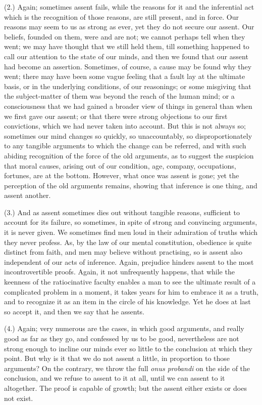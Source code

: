 (2.) Again; sometimes assent fails, while the reasons for it and
the inferential act which is the recognition of those reasons, are
still present, and in force. Our reasons may seem to us as
strong as ever, yet they do not secure our assent. Our beliefs,
founded on them, were and are not; we cannot perhaps tell when they
went; we may have thought that we still held them, till something
happened to call our attention to the state of our minds, and then we
found that our assent had become an assertion. Sometimes, of course, a
cause may be found why they went; there may have been some vague
feeling that a fault lay at the ultimate basis, or in the underlying
conditions, of our reasonings; or some misgiving that the
subject-matter of them was beyond the reach of the human mind; or a
consciousness that we had gained a broader view of things in general
than when we first gave our assent; or that there were strong
objections to our first convictions, which we had never taken into
account. But this is not always so; sometimes our mind changes so
quickly, so unaccountably, so disproportionately to any tangible
arguments to which the change can be referred, and with such abiding
recognition of the force of the old arguments, as to suggest the
suspicion that moral causes, arising out of our condition, age,
company, occupations, fortunes, are at the bottom. However, what once
was assent is gone; yet the perception of the old arguments remains,
showing that inference is one thing, and assent another.

(3.) And as assent sometimes dies out without tangible reasons,
sufficient to account for its failure, so sometimes, in spite of
strong and convincing arguments, it is never given. We sometimes find
men loud in their admiration of truths which they never profess. As,
by the law of our mental constitution, obedience is quite
distinct from faith, and men may believe without practising, so is
assent also independent of our acts of inference. Again, prejudice
hinders assent to the most incontrovertible proofs. Again, it not
unfrequently happens, that while the keenness of the ratiocinative
faculty enables a man to see the ultimate result of a complicated
problem in a moment, it takes years for him to embrace it as a truth,
and to recognize it as an item in the circle of his knowledge. Yet he
does at last so accept it, and then we say that he assents.

(4.) Again; very numerous are the cases, in which good arguments,
and really good as far as they go, and confessed by us to be good,
nevertheless are not strong enough to incline our minds ever so little
to the conclusion at which they point. But why is it that we do not
assent a little, in proportion to those arguments? On the contrary, we
throw the full \emph{onus probandi} on the side of the conclusion, and
we refuse to assent to it at all, until we can assent to it
altogether. The proof is capable of growth; but the assent either
exists or does not exist.

